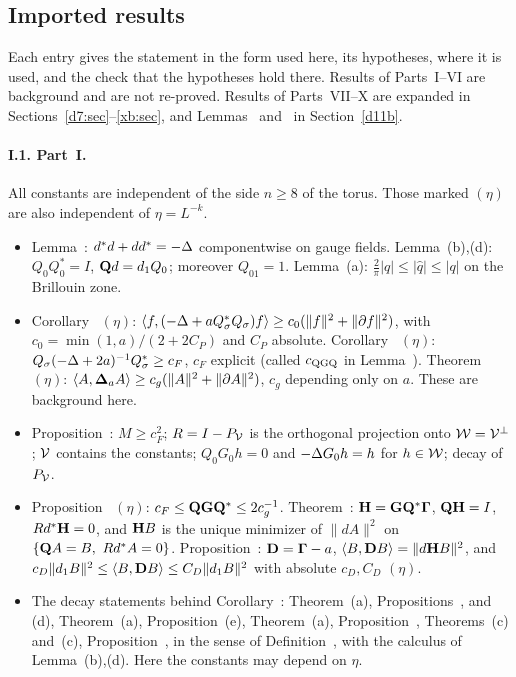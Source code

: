\subsection{Imported results}\label{d11a:imports}

Each entry gives the statement in the form used here, its hypotheses, where it is used, and the check that the hypotheses hold there. Results of Parts~I--VI are background and are not re-proved. Results of Parts~VII--X are expanded in Sections~\ref{d7:sec}--\ref{xb:sec}, and Lemmas~ and~ in Section~\ref{d11b}.

\paragraph{I.1. Part~I.} All constants are independent of the side $n\ge8$ of the torus. Those marked $(\eta)$ are also independent of $\eta=L^{-k}$.
\begin{itemize}
\item Lemma~: $d^*d+dd^*=-\Delta$ componentwise on gauge fields. Lemma~(b),(d): $Q_0Q_0^*=I$, $\mathbf Q d=d_1 Q_0$; moreover $Q_01=1$. Lemma~(a): $\frac2\pi|q|\le|\hat q|\le|q|$ on the Brillouin zone.
\item Corollary~ $(\eta)$: $\langle f,(-\Delta+aQ_\sigma^*Q_\sigma)f\rangle\ge c_0(\|f\|^2+\|\partial f\|^2)$, with $c_0=\min(1,a)/(2+2C_P)$ and $C_P$ absolute. Corollary~ $(\eta)$: $Q_\sigma(-\Delta+2a)^{-1}Q_\sigma^*\ge c_F$, $c_F$ explicit (called $c_{\rm QGQ}$ in Lemma~). Theorem~ $(\eta)$: $\langle A,\boldsymbol{\Delta}_aA\rangle\ge c_g(\|A\|^2+\|\partial A\|^2)$, $c_g$ depending only on $a$. These are background here.
\item Proposition~: $M\ge c_F^2$; $R=I-P_\mathcal V$ is the orthogonal projection onto $\mathcal W=\mathcal V^\perp$; $\mathcal V$ contains the constants; $Q_0G_0h=0$ and $-\Delta G_0h=h$ for $h\in\mathcal W$; decay of $P_\mathcal V$.
\item Proposition~ $(\eta)$: $c_F\le\mathbf Q\mathbf G\mathbf Q^*\le2c_g^{-1}$. Theorem~: $\mathbf H=\mathbf G\mathbf Q^*\boldsymbol\Gamma$, $\mathbf Q\mathbf H=I$, $Rd^*\mathbf H=0$, and $\mathbf H B$ is the unique minimizer of $\|dA\|^2$ on $\{\mathbf Q A=B,\ Rd^*A=0\}$. Proposition~: $\mathbf D=\boldsymbol\Gamma-a$, $\langle B,\mathbf D B\rangle=\|d\mathbf H B\|^2$, and $c_D\|d_1 B\|^2\le\langle B,\mathbf D B\rangle\le C_D\|d_1 B\|^2$ with absolute $c_D,C_D$ $(\eta)$.
\item The decay statements behind Corollary~: Theorem~(a), Propositions~,  and (d), Theorem~(a), Proposition~(e), Theorem~(a), Proposition~, Theorems~(c) and~(c), Proposition~, in the sense of Definition~, with the calculus of Lemma~(b),(d). Here the constants may depend on $\eta$.
\end{itemize}
